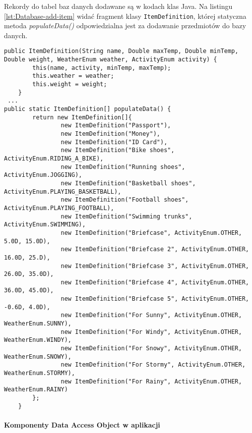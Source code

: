 \documentclass[a4paper,12pt]{article}
\begin{document}
Rekordy do tabel baz danych dodawane są w kodach klas Java. Na listingu \ref{lst:Database-add-item} widać fragment klasy \texttt{ItemDefinition}, której statyczna metoda \textit{populateData()} odpowiedzialna jest za dodawanie przedmiotów do bazy danych.

\begin{lstlisting}[caption= Konstruktor klasy ItemDefinition oraz jej statyczna metoda \textit{populateData()}, label={lst:Database-add-item}]
    public ItemDefinition(String name, Double maxTemp, Double minTemp, Double weight, WeatherEnum weather, ActivityEnum activity) {
        this(name, activity, minTemp, maxTemp);
        this.weather = weather;
        this.weight = weight;
    }
 ...
public static ItemDefinition[] populateData() {
        return new ItemDefinition[]{
                new ItemDefinition("Passport"),
                new ItemDefinition("Money"),
                new ItemDefinition("ID Card"),
                new ItemDefinition("Bike shoes", ActivityEnum.RIDING_A_BIKE),
                new ItemDefinition("Running shoes", ActivityEnum.JOGGING),
                new ItemDefinition("Basketball shoes", ActivityEnum.PLAYING_BASKETBALL),
                new ItemDefinition("Football shoes", ActivityEnum.PLAYING_FOOTBALL),
                new ItemDefinition("Swimming trunks", ActivityEnum.SWIMMING),
                new ItemDefinition("Briefcase", ActivityEnum.OTHER, 5.0D, 15.0D),
                new ItemDefinition("Briefcase 2", ActivityEnum.OTHER, 16.0D, 25.D),
                new ItemDefinition("Briefcase 3", ActivityEnum.OTHER, 26.0D, 35.0D),
                new ItemDefinition("Briefcase 4", ActivityEnum.OTHER, 36.0D, 45.0D),
                new ItemDefinition("Briefcase 5", ActivityEnum.OTHER, -0.6D, 4.0D),
                new ItemDefinition("For Sunny", ActivityEnum.OTHER, WeatherEnum.SUNNY),
                new ItemDefinition("For Windy", ActivityEnum.OTHER, WeatherEnum.WINDY),
                new ItemDefinition("For Snowy", ActivityEnum.OTHER, WeatherEnum.SNOWY),
                new ItemDefinition("For Stormy", ActivityEnum.OTHER, WeatherEnum.STORMY),
                new ItemDefinition("For Rainy", ActivityEnum.OTHER, WeatherEnum.RAINY)
        };
    }
\end{lstlisting}


\paragraph{Komponenty Data Access Object w aplikacji} ~\\
\end{document}
